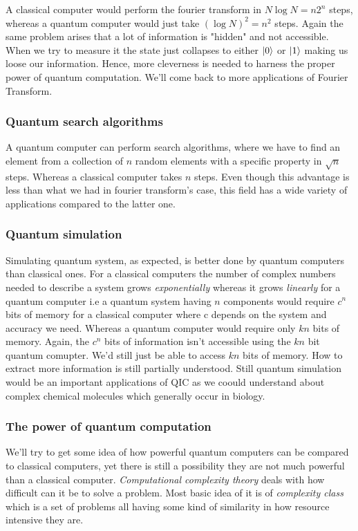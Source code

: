 A classical computer would perform the fourier transform in $N\log{N}=n2^n$ steps, whereas a quantum computer would just take $(\log{N})^2=n^2$ steps. Again the same problem arises that a lot of information is "hidden" and not accessible. When we try to measure it the state just collapses to either $\ket{0}$ or $\ket{1}$ making us loose our information. Hence, more cleverness is needed to harness the proper power of quantum computation. We'll come back to more applications of Fourier Transform.

\subsubsection{Quantum search algorithms}
A quantum computer can perform search algorithms, where we have to find an element from a collection of $n$ random elements with a specific property in $\sqrt{n}$ steps. Whereas a classical computer takes $n$ steps. Even though this advantage is less than what we had in fourier transform's case, this field has a wide variety of applications compared to the latter one.

\subsubsection{Quantum simulation}
Simulating quantum system, as expected, is better done by quantum computers than classical ones. For a classical computers the number of complex numbers needed to describe a system grows \textit{exponentially} whereas it grows \textit{linearly} for a quantum computer i.e a quantum system having $n$ components would require $c^n$ bits of memory for a classical computer where c depends on the system and accuracy we need. Whereas a quantum computer would require only $kn$ bits of memory. Again, the $c^n$ bits of information isn't accessible using the $kn$ bit quantum comupter. We'd still just be able to access $kn$ bits of memory. How to extract more information is still partially understood.
Still quantum simulation would be an important applications of QIC as we coould understand about complex chemical molecules which generally occur in biology.

\subsubsection{The power of quantum computation}
We'll try to get some idea of how powerful quantum computers can be compared to classical computers, yet there is still a possibility they are not much powerful than a classical computer. \textit{Computational complexity theory} deals with how difficult can it be to solve a problem. Most basic idea of it is of \textit{complexity class} which is a set of problems all having some kind of similarity in how resource intensive they are.

